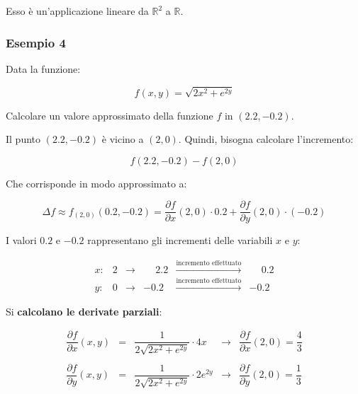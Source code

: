 \documentclass[a4paper]{article}
\begin{document}
	\noindent
	Esso è un'applicazione lineare da $\mathbb{R}^{2}$ a $\mathbb{R}$.
	
	\newpage
	
	\subsubsection[Esempio 4]{\textcolor{Green4}{Esempio 4}}
	
	Data la funzione:
	
	\begin{equation*}
		f\left(x,y\right) = \sqrt{2x^{2} + e^{2y}}
	\end{equation*}

	\noindent
	Calcolare un valore approssimato della funzione $f$ in $\left(2.2, -0.2\right)$.\newline
	
	\noindent
	Il punto $\left(2.2, -0.2\right)$ è vicino a $\left(2, 0\right)$. Quindi, bisogna calcolare l'incremento:
	
	\begin{equation*}
		f\left(2.2,-0.2\right) - f\left(2,0\right)
	\end{equation*}

	\noindent
	Che corrisponde in modo approssimato a:
	
	\begin{equation*}
		\Delta f \approx f_{\left(2,0\right)} \left(0.2,-0.2\right) = \dfrac{\partial f}{\partial x}\left(2,0\right) \cdot 0.2 + \dfrac{\partial f}{\partial y}\left(2,0\right) \cdot \left(-0.2\right)
	\end{equation*}

	\noindent
	I valori $0.2$ e $-0.2$ rappresentano gli incrementi delle variabili $x$ e $y$:
	
	\begin{equation*}
		\begin{array}{llllll}
			x: & 2 & \rightarrow & \phantom{-}2.2	& \xrightarrow{\text{incremento effettuato}} & \phantom{-}0.2 \\
			y: & 0 & \rightarrow & -0.2				& \xrightarrow{\text{incremento effettuato}} & -0.2
		\end{array}
	\end{equation*}

	\noindent
	Si \textbf{calcolano le derivate parziali}:
	
	\begin{equation*}
		\begin{array}{lllll}
			\dfrac{\partial f}{\partial x}\left(x,y\right) & = & \dfrac{1}{2\sqrt{2x^{2} + e^{2y}}} \cdot 4x		& \longrightarrow & \dfrac{\partial f}{\partial x}\left(2,0\right) = \dfrac{4}{3} \\
			&&&& \\
			\dfrac{\partial f}{\partial y}\left(x,y\right) & = & \dfrac{1}{2\sqrt{2x^{2} + e^{2y}}} \cdot 2e^{2y}	& \longrightarrow & \dfrac{\partial f}{\partial y}\left(2,0\right) = \dfrac{1}{3}
		\end{array}
	\end{equation*}
\end{document}
